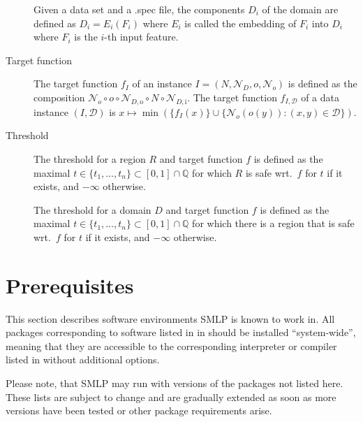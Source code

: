 \documentclass[a4paper,parskip=half]{article} %
\newcommand*\SolverAbbrvText{SMLP}
\newcommand*\SolverAbbrv{\SolverAbbrvText\xspace}
\begin{document}
\begin{description}
	Given a data set and a .spec file, the components $D_i$ of the domain
	are defined as $D_i=E_i(F_i)$ where
	$E_i$ is called the embedding of $F_i$ into $D_i$ where $F_i$ is the
	$i$-th input feature.
\item[Target function]
	The target function $f_I$ of an instance
	$I=(N,\mathcal N_D,o,\mathcal N_o)$ is defined as the composition
	$\mathcal N_o\circ o\circ\mathcal N_{D,\mathrm o}\circ
	N\circ\mathcal N_{D,\mathrm i}$.
	The target function $f_{I,\mathcal D}$ of a data instance
	$(I,\mathcal D)$ is
	$x\mapsto\min(\{f_I(x)\}\cup\{\mathcal N_o(o(y)):(x,y)\in\mathcal D\})$.
\item[Threshold]
	The threshold for a region $R$ and target function $f$ is defined
	as the maximal $t\in\{t_1,\ldots,t_n\}\subset[0,1]\cap\mathbb Q$ for
	which $R$ is safe wrt.\ $f$ for $t$ if it exists, and $-\infty$ otherwise.

	The threshold for a domain $D$ and target function $f$ is defined
	as the maximal $t\in\{t_1,\ldots,t_n\}\subset[0,1]\cap\mathbb Q$ for
	which there is a region that is safe wrt.\ $f$ for $t$ if it exists, and
	$-\infty$ otherwise.
\end{description}



\section{Prerequisites}
This section describes software environments \SolverAbbrv is known to work in.
All packages corresponding to software listed in in  should be
installed ``system-wide'',
meaning that they are accessible to the corresponding interpreter or compiler
listed in  without additional options.

Please note, that \SolverAbbrv may run with versions of the packages not listed
here. These lists are subject to change and are gradually extended as soon as
more versions have been tested or other package requirements arise.
\end{document}
